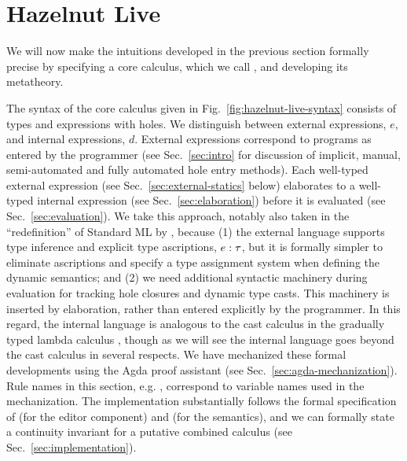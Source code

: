 \newcommand{\calculusSec}{Hazelnut Live}
\section{\protect\calculusSec}
\label{sec:calculus}





We will now make the intuitions developed in the previous section formally
precise by specifying a core calculus, which we call \HazelnutLive, and
developing its metatheory.

 The syntax of the core calculus given in
Fig.~\ref{fig:hazelnut-live-syntax} consists of types and expressions with
holes.  We distinguish between {external} expressions, $e$, and {internal}
expressions, $d$.  External expressions correspond to programs as entered
by the programmer (see Sec.~\ref{sec:intro} for discussion of implicit,
manual, semi-automated and fully automated hole entry methods).  Each
well-typed external expression (see Sec.~\ref{sec:external-statics} below)
elaborates to a well-typed internal expression (see
Sec.~\ref{sec:elaboration}) before it is evaluated (see
Sec.~\ref{sec:evaluation}).  We take this approach, notably also taken in
the ``redefinition'' of Standard ML by \citet{Harper00atype-theoretic},
because (1) the external language supports type inference and explicit type
ascriptions, $e : \tau$, but it is formally simpler to eliminate
ascriptions and specify a type assignment system when defining the dynamic
semantics; and (2) we need additional syntactic machinery during evaluation
for tracking hole closures and dynamic type casts.  This machinery is
inserted by elaboration, rather than entered explicitly by the programmer.
In this regard, the internal language is analogous to the cast calculus in
the gradually typed lambda calculus
\cite{DBLP:conf/snapl/SiekVCB15,Siek06a}, though as we will see the
\HazelnutLive internal language goes beyond the cast calculus in several
respects. We have mechanized these formal developments using the Agda proof
assistant \cite{norell:thesis,norell2009dependently} (see
Sec.~\ref{sec:agda-mechanization}). Rule names in this section,
e.g. , correspond to variable names used in the
mechanization. The \Hazel implementation substantially follows the formal
specification of \Hazelnut (for the editor component) and \HazelnutLive
(for the semantics), and we can formally state a continuity invariant for a
putative combined calculus (see Sec.~\ref{sec:implementation}).

